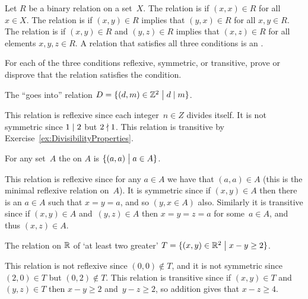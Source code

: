 \documentclass{test}  %
\begin{document}
\begin{df} 
Let $R$ be a binary relation on a set~$X$.
The relation is  if $(x,x)\in R$ for all $x\in X$.
The relation is  if $(x,y)\in R$ implies that
$(y,x)\in R$ for all $x,y\in R$.
The relation is  if 
$(x,y)\in R$ and $(y,z)\in R$ implies that 
$(x,z)\in R$ for all elements $x,y,z\in R$.
A relation that satisfies all three conditions is an
.  
\end{df}

\begin{problem} 
  For each of the three conditions reflexive, symmetric, 
  or transitive,
  prove or disprove that the relation satisfies the condition.
\begin{exes}
\begin{exercise} 
  The ``goes into'' relation
  $D=\{(d,m)\in\mathbb{Z}^2 \bigm| d\mid m\}$.
\end{exercise}
\begin{answer}
  This relation is reflexive since each integer~$n\in Z$ 
  divides itself.
  It is not symmetric since $1\mid 2$ but $2\nmid 1$.
  This relation is transitive by Exercise~\ref{ex:DivisibilityProperties}.
\end{answer}
\begin{exercise}
  For any set~$A$ the  on $A$ 
  is $\{(a,a) \bigm| a\in A\}$. 
\end{exercise}
\begin{answer}
  This relation is reflexive since for any $a\in A$ we have that
  $(a,a)\in A$ (this is the minimal reflexive relation on~$A$).
  It is symmetric since if $(x,y)\in A$ then there is an
  $a\in A$ such that $x=y=a$, and so $(y,x\in A)$ also.
  Similarly it is transitive since if 
  $(x,y)\in A$ and~$(y,z)\in A$ then $x=y=z=a$ for some~$a\in A$, and
  thus $(x,z)\in A$.
\end{answer}
\begin{exercise}
  The relation on $\mathbb{R}$ of `at least two greater'
  $T=\{(x,y)\in \mathbb{R}^2 \bigm| x-y\geq 2\}$.
\end{exercise}
\begin{answer}
  This relation is not reflexive since $(0,0)\notin T$,
  and it is not symmetric since $(2,0)\in T$ but 
  $(0,2)\notin T$.
  This relation is transitive since if $(x,y)\in T$ and $(y,z)\in T$ 
  then $x-y\geq 2$ and~$y-z\geq 2$, so addition gives that $x-z\geq 4$.
\end{answer}
\end{exes}

\end{problem}
\end{document}
